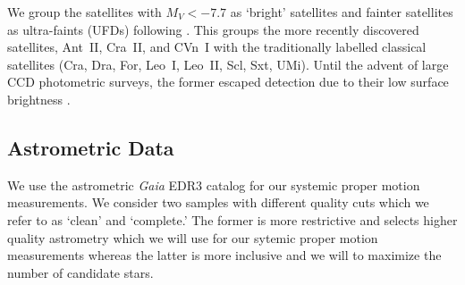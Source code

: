 \documentclass[twocolumn]{aastex63}
\begin{document}
We group the satellites with $M_V<-7.7$ as `bright' satellites and fainter satellites as ultra-faints (UFDs) following \citet{Simon2019ARA&A..57..375S}.  This groups the more recently discovered satellites, Ant~II, Cra~II, and CVn~I with the traditionally labelled classical satellites (Cra, Dra, For, Leo~I, Leo~II, Scl, Sxt, UMi). 
Until {the advent of large CCD photometric surveys}, the former escaped detection due to their low surface brightness \citep[e.g.,][]{Zucker2006ApJ...643L.103Z, Koposov2008ApJ...686..279K, Torrealba2016MNRAS.459.2370T}.



\subsection{Astrometric Data}

We use the astrometric {\it Gaia} EDR3 catalog \citep{Gaia_Brown_2021A&A...649A...1G} for our systemic proper motion measurements.  
We consider two samples with different quality cuts which we refer to as `clean' and `complete.' The former is more restrictive and selects higher quality astrometry which we will use for our sytemic proper motion measurements whereas the latter is more inclusive and we will  to maximize the number of candidate stars.
\end{document}
